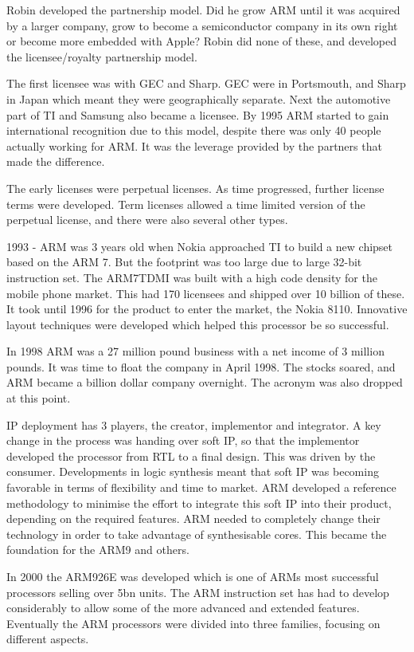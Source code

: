 Robin developed the partnership model. 
Did he grow ARM until it was acquired by a larger company, grow to become a semiconductor company in its own right or become more embedded with Apple? 
Robin did none of these, and developed the licensee/royalty partnership model. 

The first licensee was with GEC and Sharp. 
GEC were in Portsmouth, and Sharp in Japan which meant they were geographically separate. 
Next the automotive part of TI and Samsung also became a licensee. 
By 1995 ARM started to gain international recognition due to this model, despite there was only 40 people actually working for ARM. 
It was the leverage provided by the partners that made the difference.

The early licenses were perpetual licenses. 
As time progressed, further license terms were developed. 
Term licenses allowed a time limited version of the perpetual license, and there were also several other types. 

1993 - ARM was 3 years old when Nokia approached TI to build a new chipset based on the ARM 7. 
But the footprint was too large due to large 32-bit instruction set. 
The ARM7TDMI was built with a high code density for the mobile phone market. 
This had 170 licensees and shipped over 10 billion of these.
It took until 1996 for the product to enter the market, the Nokia 8110.
Innovative layout techniques were developed which helped this processor be so successful.

In 1998 ARM was a 27 million pound business with a net income of 3 million pounds. 
It was time to float the company in April 1998. 
The stocks soared, and ARM became a billion dollar company overnight. 
The acronym was also dropped at this point.

IP deployment has 3 players, the creator, implementor and integrator. 
A key change in the process was handing over soft IP, so that the implementor developed the processor from RTL to a final design. 
This was driven by the consumer. Developments in logic synthesis meant that soft IP was becoming favorable in terms of flexibility and time to market.
ARM developed a reference methodology to minimise the effort to integrate this soft IP into their product, depending on the required features. 
ARM needed to completely change their technology in order to take advantage of synthesisable cores. 
This became the foundation for the ARM9 and others.

In 2000 the ARM926E was developed which is one of ARMs most successful processors selling over 5bn units. 
The ARM instruction set has had to develop considerably to allow some of the more advanced and extended features. 
Eventually the ARM processors were divided into three families, focusing on different aspects.

